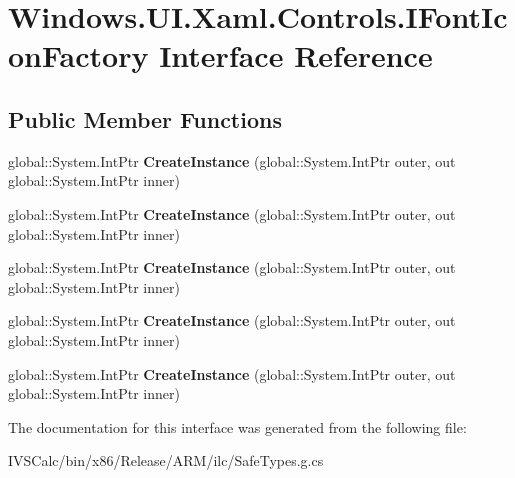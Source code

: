 \hypertarget{interface_windows_1_1_u_i_1_1_xaml_1_1_controls_1_1_i_font_icon_factory}{}\section{Windows.\+U\+I.\+Xaml.\+Controls.\+I\+Font\+Icon\+Factory Interface Reference}
\label{interface_windows_1_1_u_i_1_1_xaml_1_1_controls_1_1_i_font_icon_factory}
\subsection*{Public Member Functions}
\begin{DoxyCompactItemize}
\item 
\mbox{\label{interface_windows_1_1_u_i_1_1_xaml_1_1_controls_1_1_i_font_icon_factory_a0b86ede238cc9439c18ef5b81e0d4574}} 
global\+::\+System.\+Int\+Ptr {\bfseries Create\+Instance} (global\+::\+System.\+Int\+Ptr outer, out global\+::\+System.\+Int\+Ptr inner)
\item 
\mbox{\label{interface_windows_1_1_u_i_1_1_xaml_1_1_controls_1_1_i_font_icon_factory_a0b86ede238cc9439c18ef5b81e0d4574}} 
global\+::\+System.\+Int\+Ptr {\bfseries Create\+Instance} (global\+::\+System.\+Int\+Ptr outer, out global\+::\+System.\+Int\+Ptr inner)
\item 
\mbox{\label{interface_windows_1_1_u_i_1_1_xaml_1_1_controls_1_1_i_font_icon_factory_a0b86ede238cc9439c18ef5b81e0d4574}} 
global\+::\+System.\+Int\+Ptr {\bfseries Create\+Instance} (global\+::\+System.\+Int\+Ptr outer, out global\+::\+System.\+Int\+Ptr inner)
\item 
\mbox{\label{interface_windows_1_1_u_i_1_1_xaml_1_1_controls_1_1_i_font_icon_factory_a0b86ede238cc9439c18ef5b81e0d4574}} 
global\+::\+System.\+Int\+Ptr {\bfseries Create\+Instance} (global\+::\+System.\+Int\+Ptr outer, out global\+::\+System.\+Int\+Ptr inner)
\item 
\mbox{\label{interface_windows_1_1_u_i_1_1_xaml_1_1_controls_1_1_i_font_icon_factory_a0b86ede238cc9439c18ef5b81e0d4574}} 
global\+::\+System.\+Int\+Ptr {\bfseries Create\+Instance} (global\+::\+System.\+Int\+Ptr outer, out global\+::\+System.\+Int\+Ptr inner)
\end{DoxyCompactItemize}


The documentation for this interface was generated from the following file\+:\begin{DoxyCompactItemize}
\item 
I\+V\+S\+Calc/bin/x86/\+Release/\+A\+R\+M/ilc/Safe\+Types.\+g.\+cs\end{DoxyCompactItemize}
